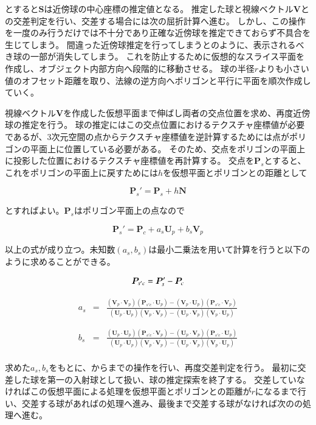 \noindent
とすると$\bm{S}$は近傍球の中心座標の推定値となる。
推定した球と視線ベクトル$\bm{V}$との交差判定を行い、交差する場合には次の屈折計算へ進む。
しかし、この操作を一度のみ行うだけでは不十分であり正確な近傍球を推定できておらず不具合を生じてしまう。
間違った近傍球推定を行ってしまうと\figref{}のように、表示されるべき球の一部が消失してしまう。
これを防止するために仮想的なスライス平面を作成し、オブジェクト内部方向へ段階的に移動させる\figref{}。
球の半径$r$よりも小さい値のオフセット距離を取り、法線の逆方向へポリゴンと平行に平面を順次作成していく。

視線ベクトル$\bm{V}$を作成した仮想平面まで伸ばし両者の交点位置を求め、再度近傍球の推定を行う。
球の推定にはこの交点位置におけるテクスチャ座標値が必要であるが、3次元空間の点からテクスチャ座標値を逆計算するためには点がポリゴンの平面上に位置している必要がある。
そのため、交点をポリゴンの平面上に投影した位置におけるテクスチャ座標値を再計算する。
交点を$\bm{P}_s$とすると、これをポリゴンの平面上に戻すためには$h$を仮想平面とポリゴンとの距離として

\begin{equation}
\bm{P}_s' = \bm{P}_s + h\bm{N}
\label{EPsdash}
\end{equation}

\noindent
とすればよい。$\bm{P}_s$はポリゴン平面上の点なので

\begin{equation}
\bm{P}_s' = \bm{P}_c + a_s\bm{U}_p + b_s\bm{V}_p 
\label{EPsdash2}
\end{equation}

\noindent
以上の式が成り立つ。未知数$(a_s, b_s)$は最小二乗法を用いて計算を行うと以下のように求めることができる。

\begin{equation}
\bm{P}_{s'c} = \bm{P}_s' - \bm{P}_c\\
\label{EPsdashc}
\end{equation}

\begin{eqnarray}
\label{Eas}
a_s &=& \frac{(\bm{V}_p \cdot \bm{V}_p)(\bm{P}_{s'c} \cdot \bm{U}_p) - (\bm{V}_p \cdot \bm{U}_p)(\bm{P}_{s'c} \cdot \bm{V}_p)}
{(\bm{U}_p \cdot \bm{U}_p)(\bm{V}_p \cdot \bm{V}_p) - (\bm{U}_p \cdot \bm{V}_p)(\bm{V}_p \cdot \bm{U}_p)}\\
\nonumber\\
\nonumber\\
\label{Ebs}
b_s &=& \frac{(\bm{U}_p \cdot \bm{U}_p)(\bm{P}_{s'c} \cdot \bm{V}_p) - (\bm{U}_p \cdot \bm{V}_p)(\bm{P}_{s'c} \cdot \bm{U}_p)}
{(\bm{U}_p \cdot \bm{U}_p)(\bm{V}_p \cdot \bm{V}_p) - (\bm{U}_p \cdot \bm{V}_p)(\bm{V}_p \cdot \bm{U}_p)}
\end{eqnarray}\\
\indent
求めた$a_s, b_s$をもとに、からまでの操作を行い、再度交差判定を行う。
最初に交差した球を第一の入射球として扱い、球の推定探索を終了する。
交差していなければこの仮想平面による処理を仮想平面とポリゴンとの距離が$r$になるまで行い、交差する球があればの処理へ進み、最後まで交差する球がなければ次のの処理へ進む。

